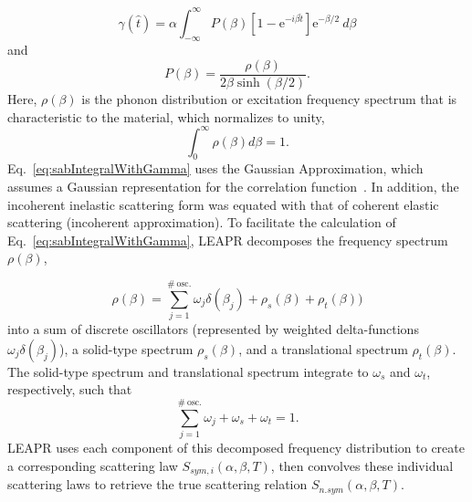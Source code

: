 \documentclass[../master.tex]{subfiles}
\begin{document}
			\begin{equation} 
				\gamma(\hat{t})=\alpha\int_{-\infty}^{\infty}P(\beta)\left[1-\mathrm{e}^{-i\beta\hat{t}}\right]\mathrm{e}^{-\beta/2}~d\beta\label{eq:gamma}
			\end{equation}
			and
			\begin{equation}
				P(\beta)=\frac{\rho(\beta)}{2\beta\sinh(\beta/2)}.
			\end{equation}
			Here, $\rho(\beta)$ is the phonon distribution or excitation frequency spectrum that is characteristic to the material, which normalizes to unity,
			\begin{equation}
				\int_{0}^{\infty}\rho(\beta)d\beta=1.
			\end{equation}
                        Eq.~\ref{eq:sabIntegralWithGamma} uses the Gaussian Approximation, which assumes a Gaussian representation for the correlation function~\cite{vineyard}. In addition, the incoherent inelastic scattering form was equated with that of coherent elastic scattering (incoherent approximation). To facilitate the calculation of Eq.~\ref{eq:sabIntegralWithGamma}, LEAPR decomposes the frequency spectrum $\rho(\beta)$,

			\begin{equation}
				\rho(\beta)=\sum_{j=1}^{\#~\mbox{osc.}}\omega_j\delta(\beta_j)+\rho_s(\beta)+\rho_t(\beta))
			\end{equation}
			into a sum of discrete oscillators (represented by weighted delta-functions $\omega_j\delta(\beta_j)$), a solid-type spectrum $\rho_s(\beta)$, and a translational spectrum $\rho_t(\beta)$. The solid-type spectrum and translational spectrum integrate to $\omega_s$ and $\omega_t$, respectively, such that 
			\begin{equation}
                          \sum_{j=1}^{\#~\mbox{osc.}}\omega_j + \omega_s + \omega_t = 1.\label{eq:weightsSumTo1}
			\end{equation}
			LEAPR uses each component of this decomposed frequency distribution to create a corresponding scattering law $S_{sym,i}(\alpha,\beta,T)$, then convolves these individual scattering laws to retrieve the true scattering relation $S_{n.sym}(\alpha,\beta,T)$.
\end{document}
